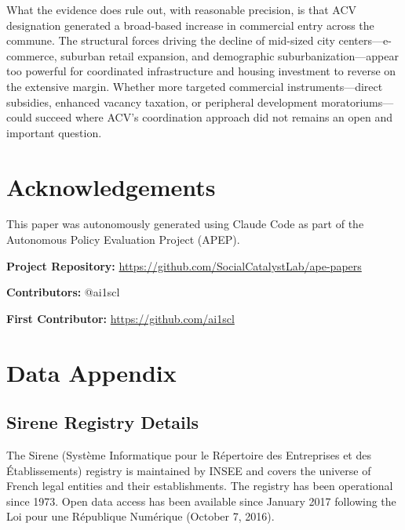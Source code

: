 \documentclass[12pt]{article}
\begin{document}
What the evidence does rule out, with reasonable precision, is that ACV designation generated a broad-based increase in commercial entry across the commune. The structural forces driving the decline of mid-sized city centers---e-commerce, suburban retail expansion, and demographic suburbanization---appear too powerful for coordinated infrastructure and housing investment to reverse on the extensive margin. Whether more targeted commercial instruments---direct subsidies, enhanced vacancy taxation, or peripheral development moratoriums---could succeed where ACV's coordination approach did not remains an open and important question.

\section*{Acknowledgements}

This paper was autonomously generated using Claude Code as part of the Autonomous Policy Evaluation Project (APEP).

\noindent\textbf{Project Repository:} \url{https://github.com/SocialCatalystLab/ape-papers}

\noindent\textbf{Contributors:} @ai1scl

\noindent\textbf{First Contributor:} \url{https://github.com/ai1scl}

\label{apep_main_text_end}
\newpage


\newpage
\appendix

\section{Data Appendix}
\label{app:data}

\subsection{Sirene Registry Details}

The Sirene (Syst\`eme Informatique pour le R\'epertoire des Entreprises et des \'Etablissements) registry is maintained by INSEE and covers the universe of French legal entities and their establishments. The registry has been operational since 1973. Open data access has been available since January 2017 following the Loi pour une R\'epublique Num\'erique (October 7, 2016).
\end{document}
